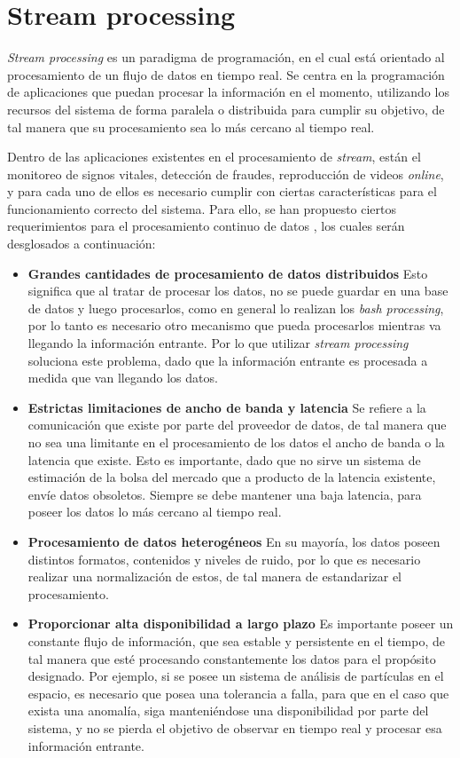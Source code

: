 \section{Stream processing}
\label{sec:streamProcessing}

\textit{Stream processing} es un paradigma de programación, en el cual está orientado al procesamiento de un flujo de datos en tiempo real. Se centra en la programación de aplicaciones que puedan procesar la información en el momento, utilizando los recursos del sistema de forma paralela o distribuida para cumplir su objetivo, de tal manera que su procesamiento sea lo más cercano al tiempo real.

Dentro de las aplicaciones existentes en el procesamiento de \textit{stream}, están el monitoreo de signos vitales, detección de fraudes, reproducción de videos \textit{online}, y para cada uno de ellos es necesario cumplir con ciertas características para el funcionamiento correcto del sistema. Para ello, se han propuesto ciertos requerimientos para el procesamiento continuo de datos \citep{andrade2014fundamentals}, los cuales serán desglosados a continuación:

\begin{itemize}
	\item \textbf{Grandes cantidades de procesamiento de datos distribuidos} 	Esto significa que al tratar de procesar los datos, no se puede guardar en una base de datos y luego procesarlos, como en general lo realizan los \textit{bash processing}, por lo tanto es necesario otro mecanismo que pueda procesarlos mientras va llegando la información entrante. Por lo que utilizar \textit{stream processing} soluciona este problema, dado que la información entrante es procesada a medida que van llegando los datos.
	\item \textbf{Estrictas limitaciones de ancho de banda y latencia} Se refiere a la comunicación que existe por parte del proveedor de datos, de tal manera que no sea una limitante en el procesamiento de los datos el ancho de banda o la latencia que existe. Esto es importante, dado que no sirve un sistema de estimación de la bolsa del mercado que a producto de la latencia existente, envíe datos obsoletos. Siempre se debe mantener una baja latencia, para poseer los datos lo más cercano al tiempo real.
	\item \textbf{Procesamiento de datos heterogéneos} En su mayoría, los datos poseen distintos formatos, contenidos y niveles de ruido, por lo que es necesario realizar una normalización de estos, de tal manera de estandarizar el procesamiento.
	\item \textbf{Proporcionar alta disponibilidad a largo plazo} Es importante poseer un constante flujo de información, que sea estable y persistente en el tiempo, de tal manera que esté procesando constantemente los datos para el propósito designado. Por ejemplo, si se posee un sistema de análisis de partículas en el espacio, es necesario que posea una tolerancia a falla, para que en el caso que exista una anomalía, siga manteniéndose una disponibilidad por parte del sistema, y no se pierda el objetivo de observar en tiempo real y procesar esa información entrante.
\end{itemize}

